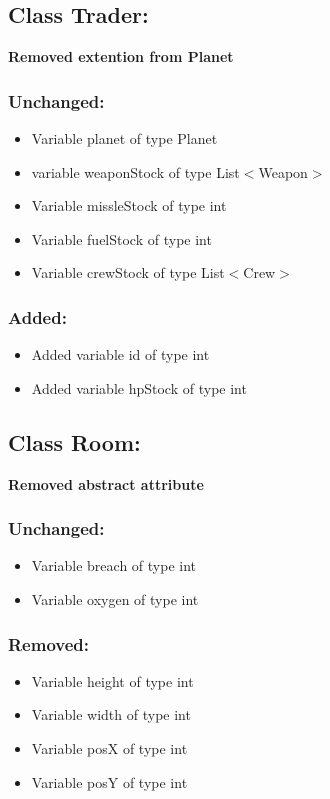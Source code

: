 \documentclass{article}
\begin{document}

\subsection{Class Trader:}

\textbf{Removed extention from Planet}

\subsubsection{Unchanged:}
\begin{itemize}
\item Variable planet of type Planet
\item variable weaponStock of type List$<$Weapon$>$
\item Variable missleStock of type int
\item Variable fuelStock of type int
\item Variable crewStock of type List$<$Crew$>$
\end{itemize}

\subsubsection{Added:}
\begin{itemize}
\item Added variable id of type int
\item Added variable hpStock of type int
\end{itemize}


\subsection{Class Room:}

\textbf{Removed abstract attribute}

\subsubsection{Unchanged:}
\begin{itemize}
\item Variable breach of type int
\item Variable oxygen of type int
\end{itemize}

\subsubsection{Removed:}
\begin{itemize}
\item Variable height of type int
\item Variable width of type int
\item Variable posX of type int
\item Variable posY of type int
\end{itemize}
\end{document}
